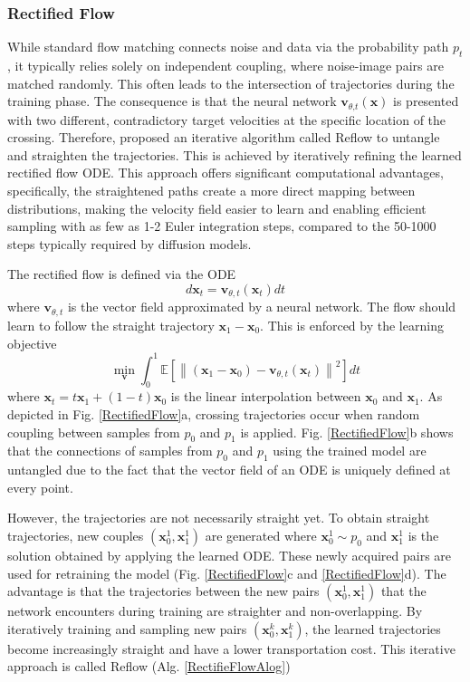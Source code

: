 \subsubsection{Rectified Flow}
While standard flow matching connects noise and data via the probability path $p_t$, it typically relies solely on independent coupling, where noise-image pairs are matched randomly. This often leads to the intersection of trajectories during the training phase. The consequence is that the neural network $\mathbf{v}_{\theta \text{,} t}(\mathbf{x})$ is presented with two different, contradictory target velocities at the specific location of the crossing. Therefore, \cite{RectifiedFlowMatching}  proposed an iterative algorithm called Reflow to untangle and straighten the trajectories. This is achieved by iteratively refining the learned rectified flow \gls{ODE}. This approach offers significant computational advantages, specifically, the straightened paths create a more direct mapping between distributions, making the velocity field easier to learn and enabling efficient sampling with as few as 1-2 Euler integration steps, compared to the 50-1000 steps typically required by diffusion models. 

The rectified flow is defined via the \gls{ODE}
\begin{equation}
d\mathbf{x}_t = \mathbf{v}_{\theta,t}(\mathbf{x}_t)dt
\label{ODERectifiedFlow}
\end{equation}
where $\mathbf{v}_{\theta,t}$ is the vector field approximated by a neural network. The flow should learn to follow the straight trajectory $\mathbf{x}_1-\mathbf{x}_0$. This is enforced by the learning objective 
\begin{equation}
    \min_\mathbf{v} \int_0^1 \mathbb{E} \left[ \left\| (\mathbf{x}_1 - \mathbf{x}_0) - \mathbf{v}_{\theta,t}(\mathbf{x}_t) \right\|^2 \right] dt
\end{equation}
where $\mathbf{x}_t = t\mathbf{x}_1 + (1-t)\mathbf{x}_0$ is the linear interpolation between $\mathbf{x}_0$ and $\mathbf{x}_1$. As depicted in Fig. \ref{RectifiedFlow}a, crossing trajectories occur when random coupling between samples from $p_0$ and $p_1$ is applied.  Fig. \ref{RectifiedFlow}b shows that the connections of samples from $p_0$ and $p_1$ using the trained model are untangled due to the fact that the vector field of an \gls{ODE} is uniquely defined at every point. 

However, the trajectories are not necessarily straight yet. To obtain straight trajectories, new couples $(\mathbf{x}^1_0,\mathbf{x}^1_1)$ are generated where $\mathbf{x}^1_0 \sim p_0$ and $\mathbf{x}^1_1$ is the solution obtained by applying the learned \gls{ODE}. These newly acquired pairs are used for retraining the model (Fig. \ref{RectifiedFlow}c and \ref{RectifiedFlow}d). The advantage is that the trajectories between the new pairs $(\mathbf{x}^1_0,\mathbf{x}^1_1)$ that the network encounters during training are straighter and non-overlapping. By iteratively training and sampling new pairs $(\mathbf{x}^k_0, \mathbf{x}^k_1)$, the learned trajectories become increasingly straight and have a lower transportation cost. This iterative approach is called Reflow (Alg. \ref{RectifieFlowAlog}) 

